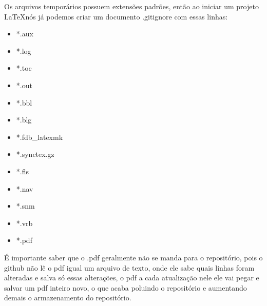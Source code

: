 Os arquivos temporários possuem extensões padrões, então ao iniciar um projeto \LaTeX nós já podemos criar um documento .gitignore com essas linhas:

\begin{itemize}
    \item *.aux
    \item *.log
    \item *.toc
    \item *.out
    \item *.bbl
    \item *.blg
    \item *.fdb\_latexmk
    \item *.synctex.gz
    \item *.fls
    \item *.nav
    \item *.snm
    \item *.vrb
    \item *.pdf
\end{itemize}

É importante saber que o .pdf geralmente não se manda para o repositório, pois o github não lê o pdf igual um arquivo de texto, onde ele sabe quais linhas foram alteradas e salva só essas alterações, o pdf a cada atualização nele ele vai pegar e salvar um pdf inteiro novo, o que acaba poluindo o repositório e aumentando demais o armazenamento do repositório.